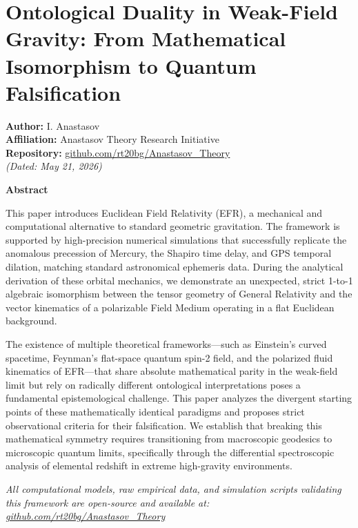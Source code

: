 \documentclass[twocolumn]{article}
\author{}
\date{}
\begin{document}
\section{Ontological Duality in Weak-Field Gravity: From Mathematical
Isomorphism to Quantum
Falsification}\label{ontological-duality-in-weak-field-gravity-from-mathematical-isomorphism-to-quantum-falsification}

\textbf{Author:} I. Anastasov\\
\textbf{Affiliation:} Anastasov Theory Research Initiative\\
\textbf{Repository:}
\href{https://github.com/rt20bg/Anastasov_Theory}{github.com/rt20bg/Anastasov\_Theory}\\
\emph{(Dated: May 21, 2026)}

\textbf{Abstract}

This paper introduces Euclidean Field Relativity (EFR), a mechanical and
computational alternative to standard geometric gravitation. The
framework is supported by high-precision numerical simulations that
successfully replicate the anomalous precession of Mercury, the Shapiro
time delay, and GPS temporal dilation, matching standard astronomical
ephemeris data. During the analytical derivation of these orbital
mechanics, we demonstrate an unexpected, strict 1-to-1 algebraic
isomorphism between the tensor geometry of General Relativity and the
vector kinematics of a polarizable Field Medium operating in a flat
Euclidean background.

The existence of multiple theoretical frameworks---such as Einstein's
curved spacetime, Feynman's flat-space quantum spin-2 field, and the
polarized fluid kinematics of EFR---that share absolute mathematical
parity in the weak-field limit but rely on radically different
ontological interpretations poses a fundamental epistemological
challenge. This paper analyzes the divergent starting points of these
mathematically identical paradigms and proposes strict observational
criteria for their falsification. We establish that breaking this
mathematical symmetry requires transitioning from macroscopic geodesics
to microscopic quantum limits, specifically through the differential
spectroscopic analysis of elemental redshift in extreme high-gravity
environments.

\emph{All computational models, raw empirical data, and simulation
scripts validating this framework are open-source and available at:
\href{https://github.com/rt20bg/Anastasov_Theory}{github.com/rt20bg/Anastasov\_Theory}}
\end{document}
